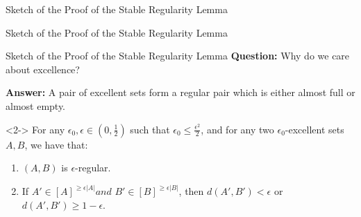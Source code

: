 \documentclass{beamer}
\newcommand{\parround}[1]{( #1 )}
\newcommand{\parsquared}[1]{[ #1 ]}
\newcommand{\parstraight}[1]{| #1 |}
\begin{document}
\begin{frame}{Sketch of the Proof of the Stable Regularity Lemma}
\begin{center}
{}
    \end{center}
\end{frame}

\begin{frame}{Sketch of the Proof of the Stable Regularity Lemma}
\end{frame}

\begin{frame}{Sketch of the Proof of the Stable Regularity Lemma}
     {
        \textbf{Question:} Why do we care about excellence?
    }

     {
        \textbf{Answer:} A pair of excellent sets form a regular pair which is either almost full or almost empty.
    }

    \begin{lemma}<2->
        For any $\epsilon_0, \epsilon \in \parround{0, \frac{1}{2}}$ such that $\epsilon_0 \leq \frac{\epsilon^2}{2}$,
        and for any two $\epsilon_0$-excellent sets $A, B$, we have that:
        \begin{enumerate}
            \item $\parround{A,B}$ is $\epsilon$-regular.
            \item If $A' \in \parsquared{A}^{\geq \epsilon \parstraight{A}} and $
                $B' \in \parsquared{B}^{\geq \epsilon \parstraight{B}}$, then $d \parround{A',B'} < \epsilon$ or
                $d \parround{A',B'} \geq 1 - \epsilon$.
        \end{enumerate}
    \end{lemma}
\end{frame}
\end{document}
